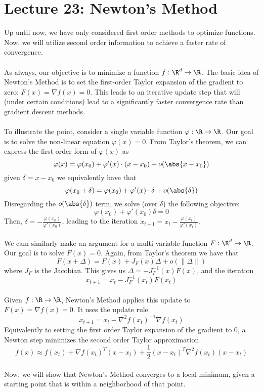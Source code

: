 \section{Lecture 23: Newton's Method}
Up until now, we have only considered first order  methods to optimize functions. Now, we will utilize second order information to achieve a faster rate of convergence.
\\
\\
As always, our objective is to minimize a function $f : \R^d \rightarrow \R$. The basic idea of Newton's Method is to set the first-order Taylor expansion of the gradient to zero: $F(x) = \nabla f(x) = 0$. This leads to an iterative update step that will (under certain conditions) lead to a significantly faster convergence rate than gradient descent methods.
\\
\\
To illustrate the point, consider a single variable function $\varphi:\R \rightarrow \R$. Our goal is to solve the non-linear equation $\varphi(x) = 0$. From Taylor's theorem, we can express the first-order form of $\varphi(x)$ as
$$\varphi(x) = \varphi(x_0) + \varphi'(x) \cdot (x-x_0) + o(\abs{x-x_0})$$
given $\delta = x - x_0$ we equivalently have that
$$\varphi(x_0 + \delta) = \varphi(x_0) + \varphi'(x) \cdot \delta + o(\abs{\delta})$$
Disregarding the $o(\abs{\delta})$ term, we solve (over $\delta$) the following objective: $$\varphi(x_0) + \varphi'(x_0) \delta = 0$$
Then, $\delta = -\frac{\varphi(x_0)}{\varphi'(x_0)}$, leading to the iteration 
$x_{t+1} = x_t - \frac{\varphi(x_t)}{\varphi'(x_t)}$.
\\
\\
We cam similarly make an argument for a multi variable function $F: \R^d \rightarrow \R$. Our goal is to solve $F(x) = 0$. Again, from Taylor's theorem we have that
$$F(x + \Delta) = F(x) +  J_F(x) \Delta + o(\| \Delta\|)$$
where $J_F$ is the Jacobian. This gives us
$\Delta = -J_F^{-1}(x)F(x)$, and the iteration
$$x_{t+1} = x_t - J_F^{-1}(x_t)F(x_t)$$
\\
Given $f : \R \rightarrow \R$, Newton's Method applies this update to $F(x) = \nabla f(x) = 0$. It uses the update rule
$$x_{t+1} = x_t - \nabla^2 f(x_t)^{-1} \nabla f(x_t)$$
Equivalently to setting the first order Taylor expansion of the gradient to 0, a Newton step minimizes the second order Taylor approximation
$$f(x) \approx f(x_t) + \nabla f(x_t)^T (x - x_t) + \frac{1}{2} (x - x_t)^T \nabla^2 f(x_t) (x - x_t)$$
\\
Now, we will show that Newton's Method converges to a local minimum, given a starting point that is within a neighborhood of that point.
